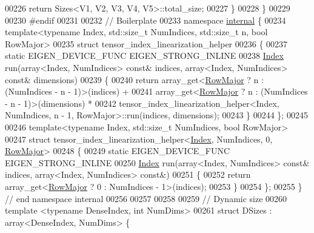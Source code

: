\begin{DoxyCode}
00226   \textcolor{keywordflow}{return} Sizes<V1, V2, V3, V4, V5>::total\_size;
00227 \}
00228 \}
00229 
00230 \textcolor{preprocessor}{#endif}
00231 
00232 \textcolor{comment}{// Boilerplate}
00233 \textcolor{keyword}{namespace }\hyperlink{namespaceinternal}{internal} \{
00234 \textcolor{keyword}{template}<\textcolor{keyword}{typename} Index, std::\textcolor{keywordtype}{size\_t} NumIndices, std::\textcolor{keywordtype}{size\_t} n, \textcolor{keywordtype}{bool} RowMajor>
00235 \textcolor{keyword}{struct }tensor\_index\_linearization\_helper
00236 \{
00237   \textcolor{keyword}{static} EIGEN\_DEVICE\_FUNC EIGEN\_STRONG\_INLINE
00238   \hyperlink{namespace_eigen_a62e77e0933482dafde8fe197d9a2cfde}{Index} run(array<Index, NumIndices> \textcolor{keyword}{const}& indices, array<Index, NumIndices> \textcolor{keyword}{const}& dimensions)
00239   \{
00240     \textcolor{keywordflow}{return} array\_get<\hyperlink{group__enums_ggaacded1a18ae58b0f554751f6cdf9eb13acfcde9cd8677c5f7caf6bd603666aae3}{RowMajor} ? n : (NumIndices - n - 1)>(indices) +
00241       array\_get<\hyperlink{group__enums_ggaacded1a18ae58b0f554751f6cdf9eb13acfcde9cd8677c5f7caf6bd603666aae3}{RowMajor} ? n : (NumIndices - n - 1)>(dimensions) *
00242         tensor\_index\_linearization\_helper<Index, NumIndices, n - 1, RowMajor>::run(indices, dimensions);
00243   \}
00244 \};
00245 
00246 \textcolor{keyword}{template}<\textcolor{keyword}{typename} Index, std::\textcolor{keywordtype}{size\_t} NumIndices, \textcolor{keywordtype}{bool} RowMajor>
00247 \textcolor{keyword}{struct }tensor\_index\_linearization\_helper<\hyperlink{namespace_eigen_a62e77e0933482dafde8fe197d9a2cfde}{Index}, NumIndices, 0, \hyperlink{group__enums_ggaacded1a18ae58b0f554751f6cdf9eb13acfcde9cd8677c5f7caf6bd603666aae3}{RowMajor}>
00248 \{
00249   \textcolor{keyword}{static} EIGEN\_DEVICE\_FUNC EIGEN\_STRONG\_INLINE
00250   \hyperlink{namespace_eigen_a62e77e0933482dafde8fe197d9a2cfde}{Index} run(array<Index, NumIndices> \textcolor{keyword}{const}& indices, array<Index, NumIndices> \textcolor{keyword}{const}&)
00251   \{
00252     \textcolor{keywordflow}{return} array\_get<\hyperlink{group__enums_ggaacded1a18ae58b0f554751f6cdf9eb13acfcde9cd8677c5f7caf6bd603666aae3}{RowMajor} ? 0 : NumIndices - 1>(indices);
00253   \}
00254 \};
00255 \}  \textcolor{comment}{// end namespace internal}
00256 
00257 
00258 
00259 \textcolor{comment}{// Dynamic size}
00260 \textcolor{keyword}{template} <\textcolor{keyword}{typename} DenseIndex, \textcolor{keywordtype}{int} NumDims>
00261 \textcolor{keyword}{struct }DSizes : array<DenseIndex, NumDims> \{

\end{DoxyCode}
